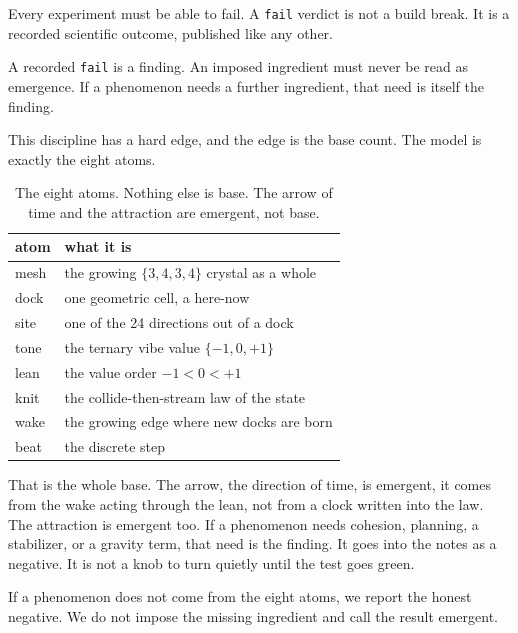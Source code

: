 Every experiment must be able to fail. A \texttt{fail} verdict is not a build break. It is a recorded scientific outcome, published like any other.

\begin{principle}
A recorded \texttt{fail} is a finding. An imposed ingredient must never be read as emergence. If a phenomenon needs a further ingredient, that need is itself the finding.
\end{principle}

This discipline has a hard edge, and the edge is the base count. The model is exactly the eight atoms.

\begin{table}[ht]
\centering
\begin{tabular}{@{}ll@{}}
\toprule
atom & what it is \\
\midrule
mesh & the growing $\{3,4,3,4\}$ crystal as a whole \\
dock & one geometric cell, a here-now \\
site & one of the 24 directions out of a dock \\
tone & the ternary vibe value $\{-1, 0, +1\}$ \\
lean & the value order $-1 < 0 < +1$ \\
knit & the collide-then-stream law of the state \\
wake & the growing edge where new docks are born \\
beat & the discrete step \\
\bottomrule
\end{tabular}
\caption{The eight atoms. Nothing else is base. The arrow of time and the attraction are emergent, not base.}
\label{tab:eight-atoms}
\end{table}

That is the whole base. The arrow, the direction of time, is emergent, it comes from the wake acting through the lean, not from a clock written into the law. The attraction is emergent too. If a phenomenon needs cohesion, planning, a stabilizer, or a gravity term, that need is the finding. It goes into the notes as a negative. It is not a knob to turn quietly until the test goes green.

\begin{result}
If a phenomenon does not come from the eight atoms, we report the honest negative. We do not impose the missing ingredient and call the result emergent.
\end{result}

